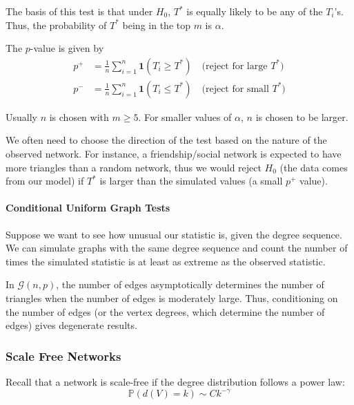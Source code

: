 \documentclass{article}
\begin{document}
The basis of this test is that under $H_0$, $T^*$ is equally likely to be any of the $T_i$'s. Thus, the probability of $T^*$ being in the top $m$ is $\alpha$. 

The $p$-value is given by 
\begin{align*}
    p^+ &= \frac{1}{n}\sum_{i=1}^{n}\mathbf{1}(T_i\geq T^*) \quad \text{(reject for large $T^*$)}\\
    p^- &= \frac{1}{n}\sum_{i=1}^{n}\mathbf{1}(T_i\leq T^*) \quad \text{(reject for small $T^*$)}
\end{align*}


\begin{remark}
    Usually $n$ is chosen with $m\geq 5$. For smaller values of $\alpha$, $n$ is chosen to be larger.  
\end{remark}

\begin{remark}
    We often need to choose the direction of the test based on the nature of the observed network. For instance, a friendship/social network is expected to have more triangles than a random network, thus we would reject $H_0$ (the data comes from our model) if $T^*$ is larger than the simulated values (a small $p^+$ value).
\end{remark}

\paragraph{Conditional Uniform Graph Tests} Suppose we want to see how unusual our statistic is, given the degree sequence. We can simulate graphs with the same degree sequence and count the number of times the simulated statistic is at least as extreme as the observed statistic.

\begin{remark}
    In $\mathcal{G}(n,p)$, the number of edges asymptotically determines
the number of triangles when the number of edges is moderately large. Thus,
conditioning on the number of edges (or the vertex degrees, which determine
the number of edges) gives degenerate results.
\end{remark}

\subsubsection{Scale Free Networks}
Recall that a network is scale-free if the degree distribution follows a power law:
\begin{equation*}
    \mathbb{P}(d(V)=k)\sim C k^{-\gamma}
\end{equation*}
\end{document}
